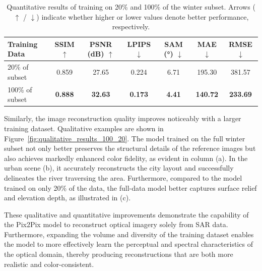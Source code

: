 \begin{table}[h!]
    \centering
    \caption[Quantitative results for different training data scales: 20\% \& 100\%]{Quantitative results of training on 20\% and 100\% of the winter subset. Arrows ($\uparrow$ / $\downarrow$) indicate whether higher or lower values denote better performance, respectively.}
    \begin{tabular}{lcccccc}
        \toprule
        \textbf{Training Data} & \textbf{SSIM $\uparrow$} & \textbf{PSNR (dB) $\uparrow$} & \textbf{LPIPS $\downarrow$} & \textbf{SAM (°) $\downarrow$} & \textbf{MAE $\downarrow$} & \textbf{RMSE $\downarrow$} \\
        \midrule
        20\% of subset         & 0.859                    & 27.65                         & 0.224                       & 6.71                          & 195.30                    & 381.57                     \\
        100\% of subset        & \textbf{0.888}           & \textbf{32.63}                & \textbf{0.173}              & \textbf{4.41}                 & \textbf{140.72}           & \textbf{233.69}            \\
        \bottomrule
    \end{tabular}
    \label{tab:quantitative_result_scale}
\end{table} 
Similarly, the image reconstruction quality improves noticeably with a larger training dataset. Qualitative examples are shown in Figure~\ref{fig:qualitative_results_100_20}. The model trained on the full winter subset not only better preserves the structural details of the reference images but also achieves markedly enhanced color fidelity, as evident in column (a). In the urban scene (b), it accurately reconstructs the city layout and successfully delineates the river traversing the area. Furthermore, compared to the model trained on only 20\% of the data, the full-data model better captures surface relief and elevation depth, as illustrated in (c).

These qualitative and quantitative improvements demonstrate the capability of the Pix2Pix model to reconstruct optical imagery solely from SAR data. Furthermore, expanding the volume and diversity of the training dataset enables the model to more effectively learn the perceptual and spectral characteristics of the optical domain, thereby producing reconstructions that are both more realistic and color-consistent.

